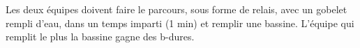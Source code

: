 \documentclass{grand-jeu}
\begin{document}
\begin{liste-materiel}
\end{liste-materiel}

\begin{regles}
Les deux équipes doivent faire le parcours, sous forme de relais, avec un gobelet rempli d’eau, dans un temps imparti (1 min) et remplir une bassine. L’équipe qui remplit le plus la bassine gagne des b-dures. 

\end{regles}

\begin{imaginaire}

\end{imaginaire}

\begin{moments-stop}
\end{moments-stop}
\end{document}
